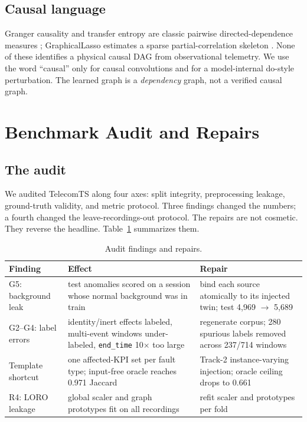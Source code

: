 \documentclass[conference]{IEEEtran}
\begin{document}
\subsection{Causal language}

Granger causality and transfer entropy are classic pairwise directed-dependence measures \cite{granger1969,schreiber2000}; GraphicalLasso estimates a sparse partial-correlation skeleton \cite{friedman2008glasso}. None of these identifies a physical causal DAG from observational telemetry. We use the word ``causal'' only for causal convolutions and for a model-internal do-style perturbation. The learned graph is a \emph{dependency} graph, not a verified causal graph.

\section{Benchmark Audit and Repairs}

\subsection{The audit}

We audited TelecomTS along four axes: split integrity, preprocessing leakage, ground-truth validity, and metric protocol. Three findings changed the numbers; a fourth changed the leave-recordings-out protocol. The repairs are not cosmetic. They reverse the headline. Table~\ref{tab:audit} summarizes them.

\begin{table}[t]
\centering
\caption{Audit findings and repairs.}
\label{tab:audit}
\small
\begin{tabular}{p{}p{}p{}}
\toprule
Finding & Effect & Repair \\
\midrule
G5: background leak & test anomalies scored on a session whose normal background was in train & bind each source atomically to its injected twin; test 4,969 $\rightarrow$ 5,689 \\
G2--G4: label errors & identity/inert effects labeled, multi-event windows under-labeled, \texttt{end\_time} 10$\times$ too large & regenerate corpus; 280 spurious labels removed across 237/714 windows \\
Template shortcut & one affected-KPI set per fault type; input-free oracle reaches 0.971 Jaccard & Track-2 instance-varying injection; oracle ceiling drops to 0.661 \\
R4: LORO leakage & global scaler and graph prototypes fit on all recordings & refit scaler and prototypes per fold \\
\bottomrule
\end{tabular}
\end{table}
\end{document}

